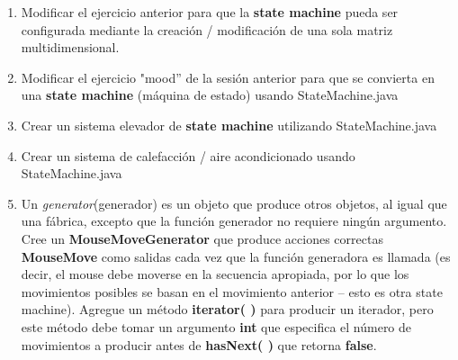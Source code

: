 \begin{enumerate}
    \item Modificar el ejercicio anterior para que la \textbf{state machine} pueda ser configurada mediante la creación / modificación de una sola matriz multidimensional.
    
    \item Modificar el ejercicio  "mood” de la sesión anterior para que se convierta en una  \textbf{state machine} (máquina de estado) usando StateMachine.java
    
    \item Crear un sistema elevador de \textbf{state machine} utilizando StateMachine.java
    
    \item Crear un sistema de calefacción / aire acondicionado usando StateMachine.java
    
    \item Un \textit{generator}(generador) es un objeto que produce otros objetos, al igual que una fábrica, excepto que la función generador no requiere ningún argumento. Cree un \textbf{MouseMoveGenerator} que produce acciones correctas \textbf{MouseMove} como salidas cada vez que la función generadora es llamada (es decir, el mouse debe moverse en la secuencia apropiada, por lo que los movimientos posibles se basan en el movimiento anterior – esto es otra state machine). Agregue un método \textbf{iterator( )} para producir un iterador, pero este método debe tomar un argumento  \textbf{int} que especifica el número de movimientos a producir antes de \textbf{hasNext( )} que retorna \textbf{false}.
    
\end{enumerate}